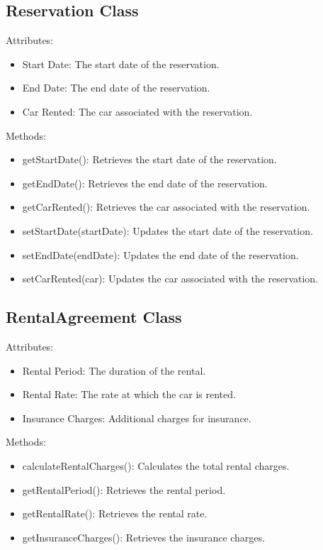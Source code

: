 \documentclass{article}
\begin{document}
\subsection{Reservation Class}
Attributes:
\begin{itemize}
    \item Start Date: The start date of the reservation.
    \item End Date: The end date of the reservation.
    \item Car Rented: The car associated with the reservation.
\end{itemize}

Methods:
\begin{itemize}
    \item getStartDate(): Retrieves the start date of the reservation.
    \item getEndDate(): Retrieves the end date of the reservation.
    \item getCarRented(): Retrieves the car associated with the reservation.
    \item setStartDate(startDate): Updates the start date of the reservation.
    \item setEndDate(endDate): Updates the end date of the reservation.
    \item setCarRented(car): Updates the car associated with the reservation.
\end{itemize}

\subsection{RentalAgreement Class}
Attributes:
\begin{itemize}
    \item Rental Period: The duration of the rental.
    \item Rental Rate: The rate at which the car is rented.
    \item Insurance Charges: Additional charges for insurance.
\end{itemize}

Methods:
\begin{itemize}
    \item calculateRentalCharges(): Calculates the total rental charges.
    \item getRentalPeriod(): Retrieves the rental period.
    \item getRentalRate(): Retrieves the rental rate.
    \item getInsuranceCharges(): Retrieves the insurance charges.
\end{itemize}
\end{document}
